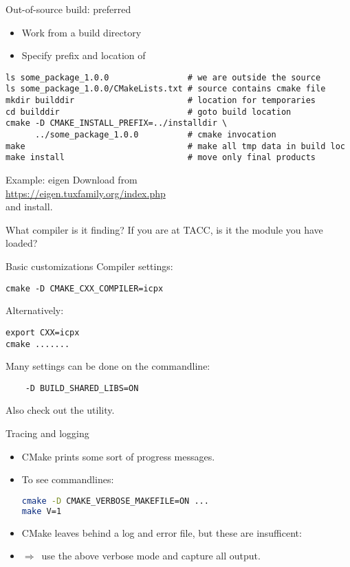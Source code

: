 \begin{numberedframe}{Out-of-source build: preferred}
  \begin{itemize}
  \item Work from a build directory
  \item Specify prefix and location of 
  \end{itemize}
\lstset{numbers=left,numberstyle=\tiny}
\begin{lstlisting}
ls some_package_1.0.0                # we are outside the source
ls some_package_1.0.0/CMakeLists.txt # source contains cmake file
mkdir builddir                       # location for temporaries
cd builddir                          # goto build location
cmake -D CMAKE_INSTALL_PREFIX=../installdir \
      ../some_package_1.0.0          # cmake invocation
make                                 # make all tmp data in build loc
make install                         # move only final products
\end{lstlisting}
\end{numberedframe}

\begin{numberedframe}{Example: eigen}
  Download from\\
  \url{https://eigen.tuxfamily.org/index.php}\\
  and install.

  What compiler is it finding? If you are at TACC,
  is it the module you have loaded?
\end{numberedframe}

\begin{numberedframe}{Basic customizations}
  Compiler settings:
\begin{lstlisting}
cmake -D CMAKE_CXX_COMPILER=icpx
\end{lstlisting}
Alternatively:
\begin{lstlisting}
export CXX=icpx
cmake .......
\end{lstlisting}
Many settings can be done on the commandline:
\begin{lstlisting}
    -D BUILD_SHARED_LIBS=ON
\end{lstlisting}
Also check out the  utility.
\end{numberedframe}

\begin{numberedframe}{Tracing and logging}
  \begin{itemize}
  \item CMake prints some sort of progress messages.
  \item To see commandlines:
\begin{lstlisting}[language=bash]
cmake -D CMAKE_VERBOSE_MAKEFILE=ON ...
make V=1
\end{lstlisting}
\item CMake leaves behind a log and error file, but these are insufficent:
  \item $\Rightarrow$~use the above verbose mode and capture all output.
  \end{itemize}
\end{numberedframe}
